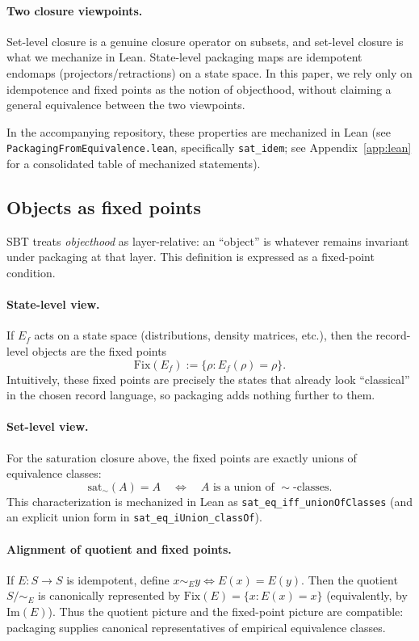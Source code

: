 \paragraph{Two closure viewpoints.}
Set-level closure is a genuine closure operator on subsets, and set-level closure is what we mechanize in Lean. State-level packaging maps are idempotent endomaps (projectors/retractions) on a state space. In this paper, we rely only on idempotence and fixed points as the notion of objecthood, without claiming a general equivalence between the two viewpoints.

In the accompanying repository, these properties are mechanized in Lean (see \texttt{Packaging\-From\-Equivalence.lean}, specifically \texttt{sat\_idem}; see Appendix~\ref{app:lean} for a consolidated table of mechanized statements).

\subsection{Objects as fixed points}

SBT treats \emph{objecthood} as layer-relative: an ``object'' is whatever remains invariant under packaging at that layer.
This definition is expressed as a fixed-point condition.

\paragraph{State-level view.}
If $E_f$ acts on a state space (distributions, density matrices, etc.), then the record-level objects are the fixed points
\[
\mathrm{Fix}(E_f) := \{\rho : E_f(\rho)=\rho\}.
\]
Intuitively, these fixed points are precisely the states that already look ``classical'' in the chosen record language, so packaging adds nothing further to them.

\paragraph{Set-level view.}
For the saturation closure above, the fixed points are exactly unions of equivalence classes:
\[
\mathrm{sat}_\sim(A)=A \quad\Longleftrightarrow\quad
\text{$A$ is a union of $\sim$-classes.}
\]
This characterization is mechanized in Lean as \texttt{sat\_eq\_iff\_unionOfClasses} (and an explicit union form in \texttt{sat\_eq\_iUnion\_classOf}).

\paragraph{Alignment of quotient and fixed points.}
If $E:S\to S$ is idempotent, define $x\sim_E y \iff E(x)=E(y)$. Then the quotient $S/{\sim_E}$ is canonically represented by $\mathrm{Fix}(E)=\{x:E(x)=x\}$ (equivalently, by $\mathrm{Im}(E)$). Thus the quotient picture and the fixed-point picture are compatible: packaging supplies canonical representatives of empirical equivalence classes.


